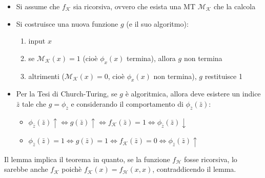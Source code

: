 \documentclass[12pt, a4paper]{report}
\begin{document}
                    \begin{demonstration}
                        \begin{itemize}
                            \item Si assume che $f_\mathcal{K}$ sia ricorsiva, ovvero che esista una MT $\mathcal{M}_\mathcal{K}$ che la calcola
                            \item Si costruisce una nuova funzione $g$ (e il suo algoritmo): \begin{enumerate}
                                \item input $x$
                                \item se $\mathcal{M}_\mathcal{K}(x) = 1$ (cioè $\phi_x(x)$ termina), allora $g$ non termina
                                \item altrimenti ($\mathcal{M}_\mathcal{K}(x) = 0$, cioè $\phi_x(x)$ non termina), $g$ restituisce 1
                            \end{enumerate} 
                            \item Per la Tesi di Church-Turing, se $g$ è algoritmica, allora deve esistere un indice $\bar{z}$ tale che $g = \phi_{\bar{z}}$ e considerando il comportamento di $\phi_{\bar{z}}(\bar{z})$: \begin{itemize}
                                \item $\phi_{\bar{z}}(\bar{z})\uparrow\iff g(\bar{z})\uparrow\iff f_\mathcal{K}(\bar{z})=1\iff \phi_{\bar{z}}(\bar{z})\downarrow$
                                \item $\phi_{\bar{z}}(\bar{z})=1\iff g(\bar{z})=1\iff f_\mathcal{K}(\bar{z})=0\iff \phi_{\bar{z}}(\bar{z})\uparrow$
                            \end{itemize}
                        \end{itemize}
                    \end{demonstration}
                    Il lemma implica il teorema in quanto, se la funzione $f_\mathcal{H}$ fosse ricorsiva, lo sarebbe anche $f_\mathcal{K}$ poichè $f_\mathcal{K}(x)=f_\mathcal{H}(x,x)$, contraddicendo il lemma.
\end{document}
